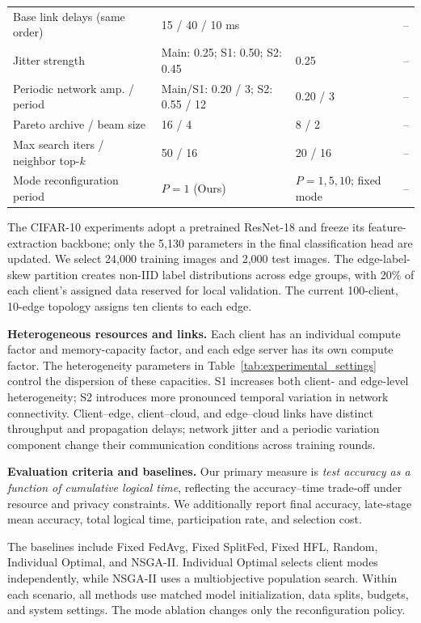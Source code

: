 \documentclass[5p,times]{elsarticle}
\theoremstyle{plain}
\theoremstyle{definition}
\theoremstyle{remark}
\begin{document}
\begin{table}[t]
\begin{tabularx}{\textwidth}{@{}p{}XXX@{}}
Base link delays (same order) & \multicolumn{2}{l}{15 / 40 / 10 ms} & -- \\
Jitter strength & Main: 0.25; S1: 0.50; S2: 0.45 & 0.25 & -- \\
Periodic network amp. / period & Main/S1: 0.20 / 3; S2: 0.55 / 12 & 0.20 / 3 & -- \\
Pareto archive / beam size & 16 / 4 & 8 / 2 & -- \\
Max search iters / neighbor top-$k$ & 50 / 16 & 20 / 16 & -- \\
Mode reconfiguration period & $P=1$ (Ours) & $P=1,5,10$; fixed mode & -- \\
\bottomrule
\end{tabularx}
\end{table}

The CIFAR-10 experiments adopt a pretrained ResNet-18 and freeze its
feature-extraction backbone; only the 5,130 parameters in the final
classification head are updated. We select 24,000 training images and
2,000 test images. The edge-label-skew partition creates
non-IID label distributions across edge groups, with 20\% of each
client's assigned data reserved for local validation. The current
100-client, 10-edge topology assigns ten clients to each edge.

\textbf{Heterogeneous resources and links.}
Each client has an individual compute factor and memory-capacity
factor, and each edge server has its own compute factor. The
heterogeneity parameters in Table~\ref{tab:experimental_settings}
control the dispersion of these capacities. S1 increases both client-
and edge-level heterogeneity; S2 introduces more pronounced temporal
variation in network connectivity. Client--edge, client--cloud, and
edge--cloud links have distinct throughput and propagation delays;
network jitter and a periodic variation component change their
communication conditions across training rounds.

\textbf{Evaluation criteria and baselines.}
Our primary measure is \emph{test accuracy as a function of cumulative
logical time}, reflecting the accuracy--time trade-off under resource
and privacy constraints. We additionally report final accuracy,
late-stage mean accuracy, total logical time, participation rate,
and selection cost.

The baselines include Fixed FedAvg, Fixed SplitFed, Fixed HFL,
Random, Individual Optimal, and NSGA-II. Individual Optimal selects
client modes independently, while NSGA-II uses a multiobjective
population search. Within each scenario, all methods use matched
model initialization, data splits, budgets, and system settings.
The mode ablation changes only the reconfiguration policy.
\end{document}
